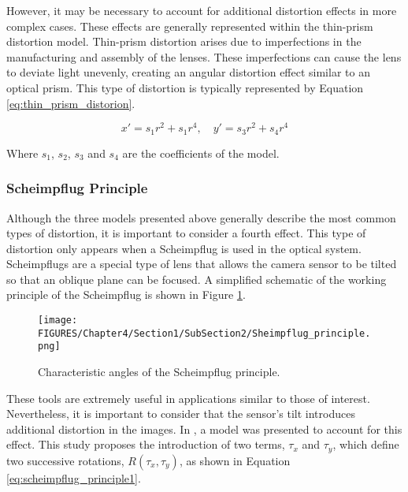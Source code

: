 However, it may be necessary to account for additional distortion effects in more complex cases. These effects are generally represented within the thin-prism distortion model. Thin-prism distortion arises due to imperfections in the manufacturing and assembly of the lenses.
These imperfections can cause the lens to deviate light unevenly, creating an angular distortion effect similar to an optical prism. This type of distortion is typically represented by Equation \ref{eq:thin_prism_distorion}.
  
  \begin{equation}
    x' = s_1 r^2 +s_1 r^4,
    \quad
    y' = s_3 r^2 +s_4 r^4
    \label{eq:thin_prism_distorion}
  \end{equation}
  
Where $s_1$, $s_2$, $s_3$ and $s_4$ are the coefficients of the model. 
  
\subsubsection{Scheimpflug Principle}
  
Although the three models presented above generally describe the most common types of distortion, it is important to consider a fourth effect. This type of distortion only appears when a Scheimpflug is used in the optical system.
Scheimpflugs are a special type of lens that allows the camera sensor to be tilted so that an oblique plane can be focused. A simplified schematic of the working principle of the Scheimpflug is shown in Figure \ref{fig:scheimpflug_principle}.
  
  \begin{figure}[htbp]
    \centering
    \texttt{[image: FIGURES/Chapter4/Section1/SubSection2/Sheimpflug\_principle.png]}
    \caption{
     Characteristic angles of the Scheimpflug principle.} 
    \label{fig:scheimpflug_principle}  
  \end{figure}

These tools are extremely useful in applications similar to those of interest. Nevertheless, it is important to consider that the sensor's tilt introduces additional distortion in the images.
In \cite{Louhichi2007}, a model was presented to account for this effect. This study proposes the introduction of two terms, $\tau_x$ and $\tau_y$, which define two successive rotations, $R(\tau_x, \tau_y)$, as shown in Equation \ref{eq:scheimpflug_principle1}.

